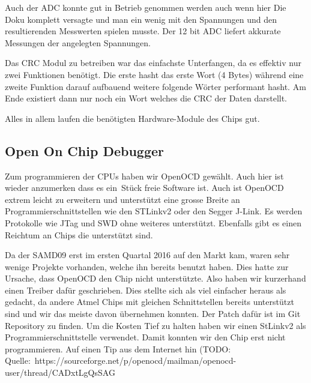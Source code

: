 Auch der ADC konnte gut in Betrieb genommen werden auch wenn hier Die Doku komplett versagte und man ein wenig mit den Spannungen und den resultierenden Messwerten spielen musste.
Der 12 bit ADC liefert akkurate Messungen der angelegten Spannungen.

Das CRC Modul zu betreiben war das einfachste Unterfangen, da es effektiv nur zwei Funktionen ben\"otigt. Die erste hasht das erste Wort (4 Bytes) w\"ahrend eine zweite Funktion darauf aufbauend weitere folgende W\"orter performant hasht.
Am Ende existiert dann nur noch ein Wort welches die CRC der Daten darstellt.

Alles in allem laufen die ben\"otigten Hardware-Module des Chips gut.

\subsection{Open On Chip Debugger}

Zum programmieren der CPUs haben wir OpenOCD gew\"ahlt. Auch hier ist wieder anzumerken dass es ein St\"uck freie Software ist.
Auch ist OpenOCD extrem leicht zu erweitern und unterst\"utzt eine grosse Breite an Programmierschnittstellen wie den STLinkv2 oder den Segger J-Link. Es werden Protokolle wie JTag und SWD ohne weiteres unterst\"utzt.
Ebenfalls gibt es einen Reichtum an Chips die unterst\"utzt sind.

Da der SAMD09 erst im ersten Quartal 2016 auf den Markt kam, waren sehr wenige Projekte vorhanden, welche ihn bereits benutzt haben. Dies hatte zur Ursache, dass OpenOCD den Chip nicht unterst\"utzte. Also haben wir kurzerhand einen Treiber daf\"ur geschrieben. Dies stellte sich als viel einfacher heraus als gedacht, da andere Atmel Chips mit gleichen Schnittstellen bereits unterst\"utzt sind und wir das meiste davon \"ubernehmen konnten. Der Patch daf\"ur ist im Git Repository zu finden.
Um die Kosten Tief zu halten haben wir einen StLinkv2 als Programmierschnittstelle verwendet. Damit konnten wir den Chip erst nicht programmieren. Auf einen Tip aus dem Internet hin (TODO: Quelle: https://sourceforge.net/p/openocd/mailman/openocd-user/thread/CADxtLgQsSAG%

